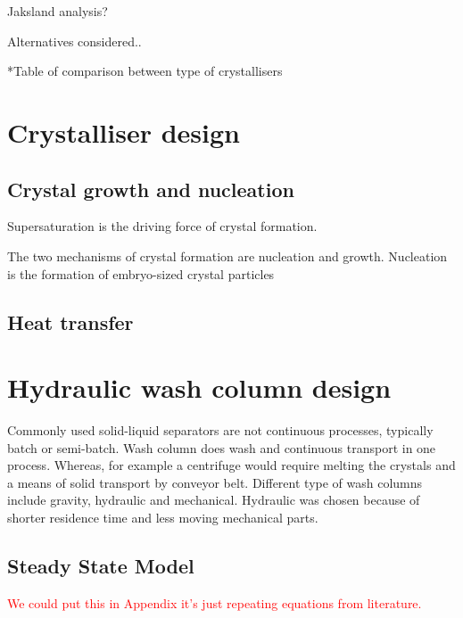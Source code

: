 Jaksland analysis?

Alternatives considered..

*Table of comparison between type of crystallisers

 




\section{Crystalliser design}


\subsection{Crystal growth and nucleation}
Supersaturation is the driving force of crystal formation. 

The two mechanisms of crystal formation are nucleation and growth. Nucleation is the formation of embryo-sized crystal particles 


\subsection{Heat transfer}





























\section{Hydraulic wash column design}

Commonly used solid-liquid separators are not continuous processes, typically batch or semi-batch. Wash column does wash and continuous transport in one process. Whereas, for example a centrifuge would require  melting the crystals and a means of solid transport by conveyor belt. Different type of wash columns include gravity, hydraulic and mechanical. Hydraulic was chosen because of shorter residence time and less moving mechanical parts. 

\subsection{Steady State Model}  \textcolor{red}{We could put this in Appendix it's just repeating equations from literature.} 

